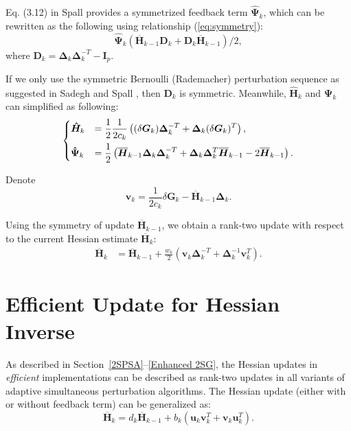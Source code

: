\documentclass[conference]{IEEEtran}
\newcommand{\bD}{\bm{D}}
\newcommand{\bG}{\bm{G}}
\newcommand{\bI}{\bm{I}}
\newcommand{\bDelta}{\bm{\Delta}}
\newcommand{\oH}{\bm{\overline{H}}}
\newcommand{\hH}{\bm{\hat{H}}}
\newcommand{\hPsi}{\bm{\hat{\Psi}}}
\begin{document}
	Eq. (3.12) in Spall \cite{Spall2009} provides a symmetrized feedback term $ \hPsi_k $, which can be rewritten as the following using relationship (\ref{eq:symmetry}):
	\begin{equation}
	\hPsi_k (\oH_{k-1}\bD_k+\bD_k\oH_{k-1})/2,
	\end{equation}
	where $ \bD_k=\bDelta_k\bDelta_k^{-T}-\bI_p$.



	If we only use the symmetric Bernoulli (Rademacher) perturbation sequence as
	suggested in Sadegh and Spall \cite{Sadegh1998}, then $\bD_k$ is
	symmetric. Meanwhile, $\hH_k$ and $\hPsi_k$ can simplified as following:
\begin{equation}
\begin{dcases}
\hH_k&=\frac{1}{2}\frac{1}{2c_k}\left( (\delta\bG_k)\bDelta_k^{-T}+\bDelta_k(\delta\bG_k)^{T} \right),\\
  \hPsi_k &=\frac{1}{2}\left( \oH_{k-1}\bDelta_k\bDelta_k^{-T}+\bDelta_k\bDelta_k^{T}\oH_{k-1}-2\oH_{k-1} \right).
\end{dcases}
\end{equation}

Denote
\begin{equation}
\bm{v}_k= \frac{1}{2c_k}\delta\bG_k-\oH_{k-1}\bDelta_k.
\end{equation}

	Using the symmetry of update $\oH_{k-1}$, we obtain a rank-two update with respect to the current Hessian estimate $\oH_k$:
	\begin{align*}
	\oH_k&=\oH_{k-1}+\frac{w_k}{2} (\bm{v}_k\bDelta_k^{-T}+\bDelta_k^{-1}\bm{v}_k^{T}).
	\end{align*}







\section{Efficient Update for Hessian Inverse}
As described in Section~\ref{2SPSA}--\ref{Enhanced 2SG}, the
Hessian updates in \textit{efficient} implementations can be described as rank-two updates in all variants of adaptive simultaneous perturbation algorithms. The Hessian update (either with or without feedback term) can be generalized as:
\begin{equation}
\label{eq:CoherentRecursion}
  \oH_{k}=d_k\oH_{k-1}+b_k(\bm{u}_k \bm{v}_k^{T}+\bm{v}_k \bm{u}_k^{T}).
\end{equation}
\end{document}
